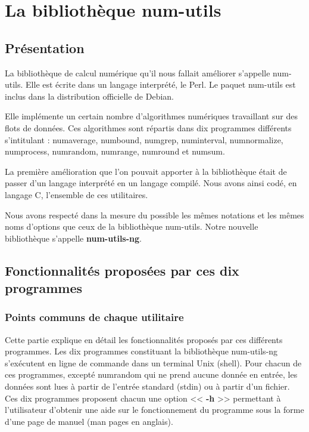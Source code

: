 \chapter{La biblioth\`eque num-utils}
\label{chap:La bibliotheque num-utils}

\section{Pr\'esentation}
La biblioth\`eque de calcul num\'erique qu'il nous fallait am\'eliorer s'appelle num-utils. Elle est \'ecrite dans un langage
interpr\'et\'e, le Perl.
Le paquet num-utils est inclus dans la distribution officielle de Debian.

Elle impl\'emente un certain nombre d'algorithmes num\'eriques travaillant sur des flots de donn\'ees.
Ces algorithmes sont r\'epartis dans dix programmes diff\'erents s'intitulant : numaverage, numbound, numgrep, numinterval, numnormalize,
numprocess, numrandom, numrange, numround et numsum.

La premi\`ere am\'elioration que l'on pouvait apporter \`a la biblioth\`eque \'etait de passer d'un langage interpr\'et\'e en un langage compil\'e.
Nous avons ainsi cod\'e, en langage C, l'ensemble de ces utilitaires.

Nous avons respect\'e dans la mesure du possible les m\^emes notations et les m\^emes noms d'options que ceux de la biblioth\`eque num-utils.
Notre nouvelle biblioth\`eque s'appelle \textbf{num-utils-ng}.

\section{Fonctionnalit\'es propos\'ees par ces dix programmes}

\subsection{Points communs de chaque utilitaire}
Cette partie explique en d\'etail les fonctionnalit\'es propos\'es par ces diff\'erents programmes.
Les dix programmes constituant la biblioth\`eque num-utils-ng s'ex\'ecutent en ligne de commande dans un terminal Unix (shell).
Pour chacun de ces programmes, except\'e numrandom qui ne prend aucune donn\'ee en entr\'ee, les donn\'ees sont lues \`a partir 
de l'entr\'ee standard (stdin) ou \`a partir d'un fichier.
Ces dix programmes proposent chacun une option << \textbf{-h} >> permettant \`a l'utilisateur d'obtenir une aide sur le fonctionnement du 
programme sous la forme d'une page de manuel (man pages en anglais).


